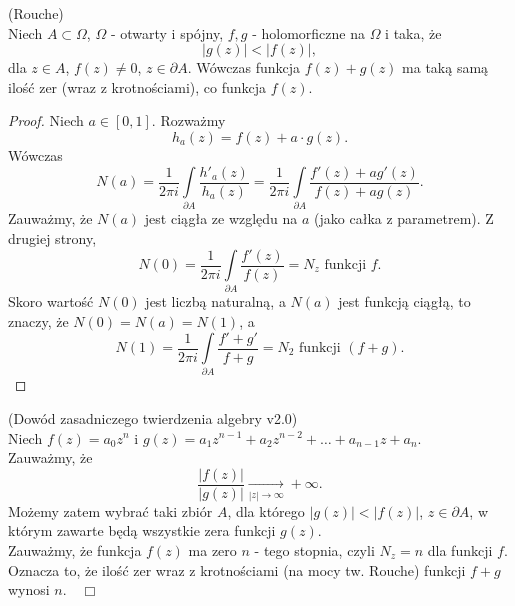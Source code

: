 \documentclass[../main.tex]{subfiles}
\begin{document}
\pagebreak
\begin{tw}
    (Rouche)\\
    Niech $A\subset\Omega$, $\Omega$ - otwarty i spójny, $f,g$ - holomorficzne na $\Omega$ i taka, że
    \[
        \left| g(z) \right| < \left| f(z) \right|
    ,\]
dla $z\in A$, $f(z) \neq 0$, $z\in \partial A$.
    Wówczas funkcja $f(z) + g(z)$ ma taką samą ilość zer (wraz z krotnościami), co funkcja $f(z)$.
\end{tw}
\begin{proof}
    Niech $a\in \left[ 0,1 \right] $. Rozważmy
    \[
        h_a(z) = f(z) + a\cdot g(z)
    .\]
Wówczas
\[
    N(a) = \frac{1}{2\pi i} \int\limits_{\partial A}\frac{h'_a(z)}{h_a(z)} = \frac{1}{2\pi i}\int\limits_{\partial A} \frac{f'(z) + a g'(z)}{f(z) + ag(z)}
.\]
Zauważmy, że $N(a)$ jest ciągła ze względu na $a$ (jako całka z parametrem). Z drugiej strony,
\[
    N(0) = \frac{1}{2\pi i}\int\limits_{\partial A} \frac{f'(z)}{f(z)} = N_z \text{ funkcji } f
.\]
Skoro wartość $N(0)$ jest liczbą naturalną, a $N(a)$ jest funkcją ciągłą, to znaczy, że $N(0) = N(a) = N(1)$, a
\[
    N(1) = \frac{1}{2\pi i}\int\limits_{\partial A}\frac{f' + g'}{f+g} = N_2 \text{ funkcji }(f+g)
.\]
\end{proof}
\begin{przyklad}
    (Dowód zasadniczego twierdzenia algebry v2.0)\\
    Niech $f(z) = a_0z^n$ i $g(z) = a_1z^{n-1} + a_2z^{n-2} + \ldots + a_{n-1}z + a_n$.\\
    Zauważmy, że
    \[
        \frac{\left| f(z) \right| }{\left| g(z) \right| } \underset{|z|\to \infty}{\longrightarrow} +\infty
    .\]
Możemy zatem wybrać taki zbiór $A$, dla którego $|g(z)| < |f(z)|$, $z\in \partial A$, w którym zawarte będą wszystkie zera funkcji $g(z)$.\\
    Zauważmy, że funkcja $f(z)$ ma zero $n$ - tego stopnia, czyli $N_z = n$ dla funkcji $f$. Oznacza to, że ilość zer wraz z krotnościami (na mocy tw. Rouche) funkcji $f+g$ wynosi $n.\quad \Box$
\end{przyklad}
\end{document}
